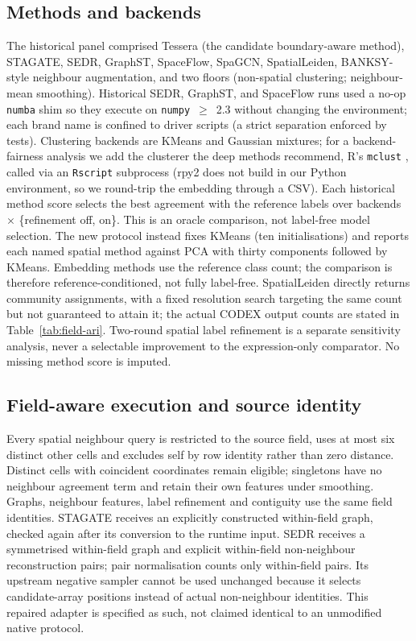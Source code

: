 \documentclass[11pt]{article}
\begin{document}
\subsection{Methods and backends}
The historical panel comprised Tessera (the candidate boundary-aware method),
STAGATE, SEDR, GraphST, SpaceFlow, SpaGCN, SpatialLeiden, BANKSY-style neighbour augmentation, and two
floors (non-spatial clustering; neighbour-mean smoothing). Historical SEDR, GraphST, and SpaceFlow runs used a no-op
\texttt{numba} shim so they execute on \texttt{numpy}~$\geq$~2.3 without changing the environment; each
brand name is confined to driver scripts (a strict separation enforced by tests). Clustering backends are
KMeans \citep{macqueen1967kmeans} and Gaussian mixtures; for a backend-fairness analysis we add
the clusterer the deep methods recommend, R's \texttt{mclust} \citep{scrucca2016mclust}, called
via an \texttt{Rscript} subprocess (rpy2 does not build in our Python environment, so we round-trip
the embedding through a CSV). Each historical method score selects the best agreement with the reference labels over backends
$\times$ \{refinement off, on\}. This is an oracle comparison, not label-free model selection. The new protocol instead fixes KMeans (ten initialisations) and reports each named spatial method against PCA with thirty components followed by KMeans. Embedding methods use the reference class count; the comparison is therefore reference-conditioned, not fully label-free. SpatialLeiden directly returns community assignments, with a fixed resolution search targeting the same count but not guaranteed to attain it; the actual CODEX output counts are stated in Table~\ref{tab:field-ari}. Two-round spatial label refinement is a separate sensitivity analysis, never a selectable improvement to the expression-only comparator. No missing method score is imputed.

\subsection{Field-aware execution and source identity}
Every spatial neighbour query is restricted to the source field, uses at most six distinct other cells and excludes self by row identity rather than zero distance. Distinct cells with coincident coordinates remain eligible; singletons have no neighbour agreement term and retain their own features under smoothing. Graphs, neighbour features, label refinement and contiguity use the same field identities. STAGATE receives an explicitly constructed within-field graph, checked again after its conversion to the runtime input. SEDR receives a symmetrised within-field graph and explicit within-field non-neighbour reconstruction pairs; pair normalisation counts only within-field pairs. Its upstream negative sampler cannot be used unchanged because it selects candidate-array positions instead of actual non-neighbour identities. This repaired adapter is specified as such, not claimed identical to an unmodified native protocol.
\end{document}
